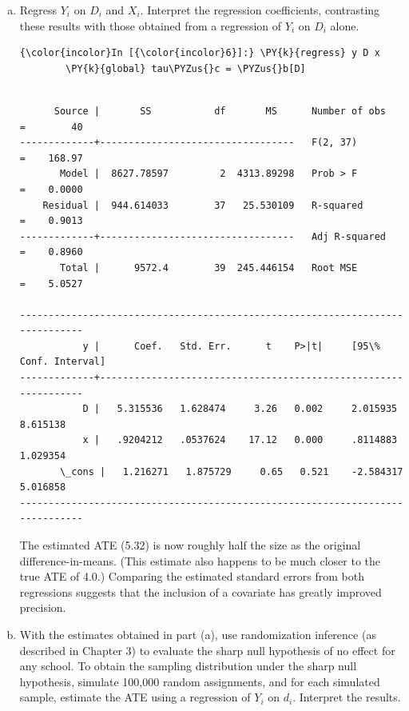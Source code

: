 \documentclass[11pt,notitlepage]{article}\usepackage[]{graphicx}\usepackage[]{color}
\makeatletter
\newenvironment{kframe}{%
 \def\at@end@of@kframe{}%
 \ifinner\ifhmode%
  \def\at@end@of@kframe{\end{minipage}}%
  \begin{minipage}{\columnwidth}%
 \fi\fi%
 \def\FrameCommand##1{\hskip\@totalleftmargin \hskip-\fboxsep
 \colorbox{shadecolor}{##1}\hskip-\fboxsep
     \hskip-\linewidth \hskip-\@totalleftmargin \hskip\columnwidth}%
 \MakeFramed {\advance\hsize-\width
   \@totalleftmargin\z@ \linewidth\hsize
   \@setminipage}}%
 {\par\unskip\endMakeFramed%
 \at@end@of@kframe}
\newenvironment{knitrout}{}{} %
\makeatother
\begin{document}
\begin{enumerate}[a)]
\item   Regress $Y_i$ on $D_i$ and $X_i$. Interpret the regression coefficients, contrasting these results with those obtained from a regression of $Y_i$ on $D_i$ alone.

\begin{knitrout}
\color{fgcolor}\begin{kframe}
    \begin{Verbatim}[commandchars=\\\{\}]
{\color{incolor}In [{\color{incolor}6}]:} \PY{k}{regress} y D x
        \PY{k}{global} tau\PYZus{}c = \PYZus{}b[D]
\end{Verbatim}

    \begin{Verbatim}[commandchars=\\\{\}]

      Source |       SS           df       MS      Number of obs   =        40
-------------+----------------------------------   F(2, 37)        =    168.97
       Model |  8627.78597         2  4313.89298   Prob > F        =    0.0000
    Residual |  944.614033        37   25.530109   R-squared       =    0.9013
-------------+----------------------------------   Adj R-squared   =    0.8960
       Total |      9572.4        39  245.446154   Root MSE        =    5.0527

------------------------------------------------------------------------------
           y |      Coef.   Std. Err.      t    P>|t|     [95\% Conf. Interval]
-------------+----------------------------------------------------------------
           D |   5.315536   1.628474     3.26   0.002     2.015935    8.615138
           x |   .9204212   .0537624    17.12   0.000     .8114883    1.029354
       \_cons |   1.216271   1.875729     0.65   0.521    -2.584317    5.016858
------------------------------------------------------------------------------

    \end{Verbatim}
\end{kframe}
\end{knitrout}

The estimated ATE (5.32) is now roughly half the size as the original difference-in-means.  (This estimate also happens to be much closer to the true ATE of 4.0.) Comparing the estimated standard errors from both regressions suggests that the inclusion of a covariate has greatly improved precision.

\item With the estimates obtained in part (a), use randomization inference (as described in Chapter 3) to evaluate the sharp null hypothesis of no effect for any school. To obtain the sampling distribution under the sharp null hypothesis, simulate 100,000 random assignments, and for each simulated sample, estimate the ATE using a regression of $Y_i$ on $d_i$. Interpret the results.  


\end{enumerate}
\end{document}
